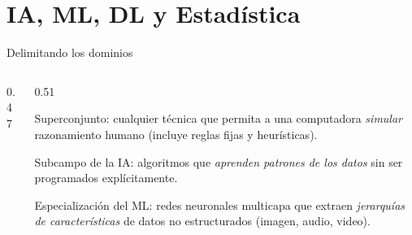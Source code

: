\documentclass[10pt,aspectratio=169]{beamer}
\begin{document}
\section{IA, ML, DL y Estadística}

\begin{frame}{Delimitando los dominios}
  \begin{columns}[T]
    \begin{column}{0.47\textwidth}
      \centering
    \end{column}
    \begin{column}{0.51\textwidth}
      \small
      \begin{description}[IA]
        \item[IA] Superconjunto: cualquier técnica que permita a una computadora \emph{simular} razonamiento humano (incluye reglas fijas y heurísticas).
        \item[ML] Subcampo de la IA: algoritmos que \emph{aprenden patrones de los datos} sin ser programados explícitamente.
        \item[DL] Especialización del ML: redes neuronales multicapa que extraen \emph{jerarquías de características} de datos no estructurados (imagen, audio, video).
      \end{description}
    \end{column}
  \end{columns}
\end{frame}
\end{document}
